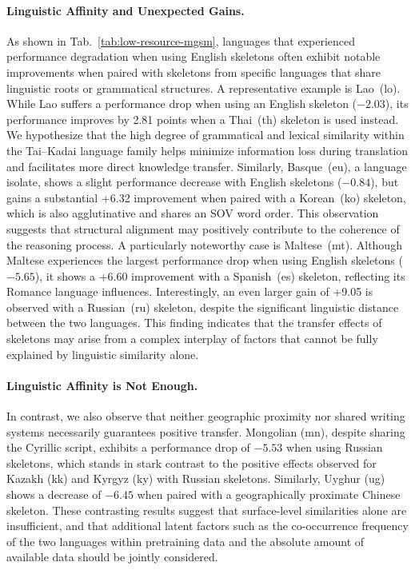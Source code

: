 \paragraph{Linguistic Affinity and Unexpected Gains.}
As shown in Tab.~\ref{tab:low-resource-mgsm}, languages that experienced performance degradation when using English skeletons often exhibit notable improvements when paired with skeletons from specific languages that share linguistic roots or grammatical structures. A representative example is Lao~(lo). While Lao suffers a performance drop when using an English skeleton ($-2.03$), its performance improves by 2.81 points when a Thai~(th) skeleton is used instead. We hypothesize that the high degree of grammatical and lexical similarity within the Tai–Kadai language family helps minimize information loss during translation and facilitates more direct knowledge transfer. Similarly, Basque~(eu), a language isolate, shows a slight performance decrease with English skeletons ($-0.84$), but gains a substantial +6.32 improvement when paired with a Korean~(ko) skeleton, which is also agglutinative and shares an SOV word order. This observation suggests that structural alignment may positively contribute to the coherence of the reasoning process. A particularly noteworthy case is Maltese~(mt). Although Maltese experiences the largest performance drop when using English skeletons ($-5.65$), it shows a +6.60 improvement with a Spanish~(es) skeleton, reflecting its Romance language influences. Interestingly, an even larger gain of +9.05 is observed with a Russian~(ru) skeleton, despite the significant linguistic distance between the two languages. This finding indicates that the transfer effects of skeletons may arise from a complex interplay of factors that cannot be fully explained by linguistic similarity alone.

\paragraph{Linguistic Affinity is Not Enough.}
In contrast, we also observe that neither geographic proximity nor shared writing systems necessarily guarantees positive transfer. Mongolian (mn), despite sharing the Cyrillic script, exhibits a performance drop of $-5.53$ when using Russian skeletons, which stands in stark contrast to the positive effects observed for Kazakh (kk) and Kyrgyz (ky) with Russian skeletons. Similarly, Uyghur (ug) shows a decrease of $-6.45$ when paired with a geographically proximate Chinese skeleton. These contrasting results suggest that surface-level similarities alone are insufficient, and that additional latent factors such as the co-occurrence frequency of the two languages within pretraining data and the absolute amount of available data should be jointly considered.


